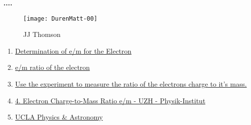 \documentclass[../main.tex]{subfiles}
\begin{document}
\textbf{....}
        \begin{figure}[bh]
        \centering
        \texttt{[image: DurenMatt-00]}
        \label{fig:img1}
        \caption{JJ Thomson}
    \end{figure}
    
  
\begin{enumerate}
    \item \href{https://www.webassign.net/question_assets/unccolphyseml1/lab_4/manual.html}{Determination of e/m for the Electron}
    \item \href{https://physicsx.erau.edu/HelmholtzCoils/Lab_MP_1.pdf}{e/m ratio of the electron}
    \item \href{https://virtuelle-experimente.de/en/b-feld/e-m-bestimmung/edurchm.php}{Use the experiment to measure the ratio of the electrons charge to it's mass.}{}
    \item \href{https://www.physik.uzh.ch/~matthias/espace-assistant/manuals/en/anleitung_etom_e.pdf}{4. Electron Charge-to-Mass Ratio e/m - UZH - Physik-Institut}
    \item \href{https://demoweb.physics.ucla.edu/6b-lab-manual}{UCLA Physics & Astronomy}
\end{enumerate}
\end{document}
